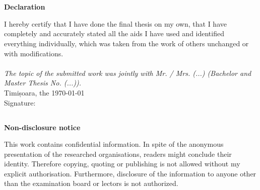\chapter*{}
\centerline{\Large \textsf{\textbf{Declaration}}} \label{Declaration}%
\vspace*{2ex}
%
I hereby certify that I have done the final thesis on my own, that I have completely and accurately stated all the aids I have used and identified everything individually, which was taken from the work of others unchanged or with modifications.\\
\\
{\itshape
The topic of the submitted work was jointly with
Mr. / Mrs. (...) (Bachelor and Master Thesis No. (...)).
}\\

\vspace*{4ex}
Timișoara, the \today \\

\vspace*{4ex} 
Signature:\\


\vspace{2cm}

\section*{}
\centerline{\Large \textsf{\textbf{Non-disclosure notice}}} %
\vspace*{2ex}
	
This work contains confidential information. In spite of the anonymous presentation of the researched organisations, readers might conclude their identity. Therefore copying, quoting or publishing is not allowed without my explicit authorisation. Furthermore, disclosure of the information to anyone other than the examination board or lectors is not authorized.

